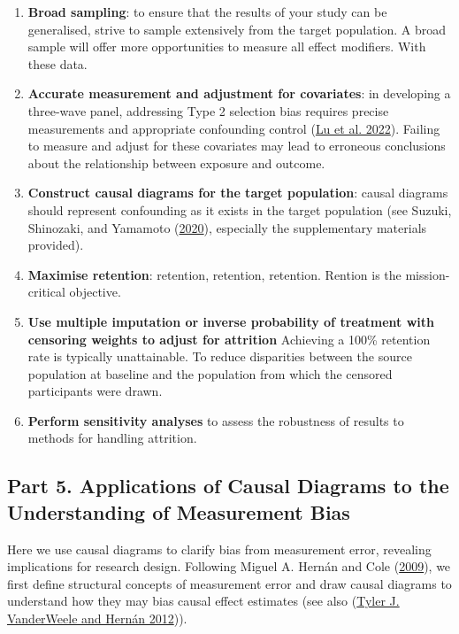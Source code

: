 \documentclass[
  singlecolumn]{article}
\begin{document}
\begin{enumerate}
\def\labelenumi{\arabic{enumi}.}
\item
  \textbf{Broad sampling}: to ensure that the results of your study can
  be generalised, strive to sample extensively from the target
  population. A broad sample will offer more opportunities to measure
  all effect modifiers. With these data.
\item
  \textbf{Accurate measurement and adjustment for covariates}: in
  developing a three-wave panel, addressing Type 2 selection bias
  requires precise measurements and appropriate confounding control
  (\protect\hyperlink{ref-lu2022}{Lu et al. 2022}). Failing to measure
  and adjust for these covariates may lead to erroneous conclusions
  about the relationship between exposure and outcome.
\item
  \textbf{Construct causal diagrams for the target population}: causal
  diagrams should represent confounding as it exists in the target
  population (see Suzuki, Shinozaki, and Yamamoto
  (\protect\hyperlink{ref-suzuki2020}{2020}), especially the
  supplementary materials provided).
\item
  \textbf{Maximise retention}: retention, retention, retention. Rention
  is the mission-critical objective.
\item
  \textbf{Use multiple imputation or inverse probability of treatment
  with censoring weights to adjust for attrition} Achieving a 100\%
  retention rate is typically unattainable. To reduce disparities
  between the source population at baseline and the population from
  which the censored participants were drawn.
\item
  \textbf{Perform sensitivity analyses} to assess the robustness of
  results to methods for handling attrition.
\end{enumerate}

\hypertarget{part-5.-applications-of-causal-diagrams-to-the-understanding-of-measurement-bias}{%
\subsection{Part 5. Applications of Causal Diagrams to the Understanding
of Measurement
Bias}\label{part-5.-applications-of-causal-diagrams-to-the-understanding-of-measurement-bias}}

Here we use causal diagrams to clarify bias from measurement error,
revealing implications for research design. Following Miguel A. Hernán
and Cole (\protect\hyperlink{ref-hernuxe1n2009}{2009}), we first define
structural concepts of measurement error and draw causal diagrams to
understand how they may bias causal effect estimates (see also
(\protect\hyperlink{ref-vanderweele2012}{Tyler J. VanderWeele and Hernán
2012})).
\end{document}

